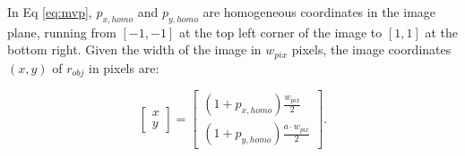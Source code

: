 In Eq \ref{eq:mvp}, $p_{x, homo}$ and $p_{y, homo}$ are homogeneous coordinates in the image plane, running from $[-1, -1]$ at the top left corner of the image to $[1, 1]$ at the bottom right. Given the width of the image in $w_{pix}$ pixels, the image coordinates $\left(x,y\right)$ of $r_{obj}$ in pixels are:

\begin{equation} \label{eq:homo_to_pix}
  \begin{bmatrix} x \\ y \end{bmatrix} = \begin{bmatrix} \left(1 + p_{x, homo}\right) \frac{w_{pix}}{2} \\ \left(1 + p_{y, homo}\right) \frac{a \cdot w_{pix}}{2} \end{bmatrix}.
\end{equation}

